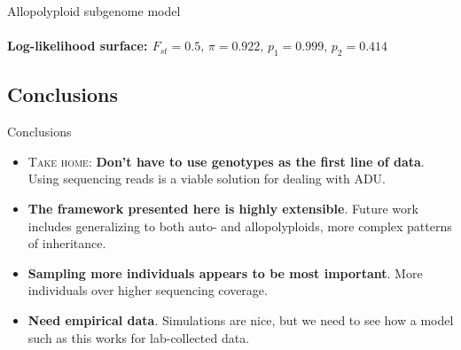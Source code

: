 \documentclass[presentation,sansserif]{beamer}
\begin{document}
{  %
\begin{frame}[c,plain]{Allopolyploid subgenome model}
	\framesubtitle{Log-likelihood surface: $F_{st}=0.5,\, \pi=0.922,\, p_1=0.999,\, p_2=0.414$}
	\begin{center}
	\end{center}
\end{frame}
}

\subsection*{Conclusions}

\begin{frame}[t]{Conclusions}
	\fontsize{10pt}{10}\selectfont
	\begin{itemize}
		\item \textsc{Take home}: \textbf{Don't have to use genotypes as the first line of data}. Using sequencing reads is a viable solution for dealing with ADU.
		\vspace{0.2in}

		\item \textbf{The framework presented here is highly extensible}. Future work includes generalizing to both auto- and allopolyploids, more complex patterns of inheritance.
		\vspace{0.2in}

		\item \textbf{Sampling more individuals appears to be most important}. More individuals over higher sequencing coverage.
		\vspace{0.2in}

		\item \textbf{Need empirical data}. Simulations are nice, but we need to see how a model such as this works for lab-collected data.

	\end{itemize}

\end{frame}
\end{document}
